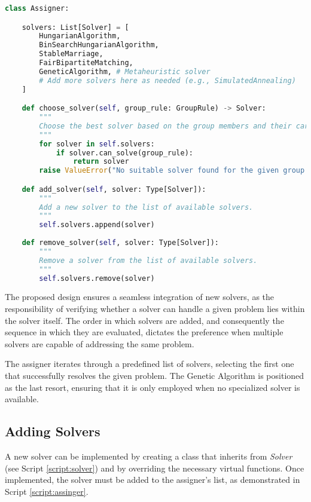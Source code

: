     \begin{lstlisting}[language=Python, caption={Assigner Class.}, label={script:assinger}]
class Assigner:

    solvers: List[Solver] = [
        HungarianAlgorithm,
        BinSearchHungarianAlgorithm,
        StableMarriage,
        FairBipartiteMatching,
        GeneticAlgorithm, # Metaheuristic solver
        # Add more solvers here as needed (e.g., SimulatedAnnealing)
    ]

    def choose_solver(self, group_rule: GroupRule) -> Solver:
        """
        Choose the best solver based on the group members and their cardinality.
        """
        for solver in self.solvers:
            if solver.can_solve(group_rule):
                return solver
        raise ValueError("No suitable solver found for the given group.")

    def add_solver(self, solver: Type[Solver]):
        """
        Add a new solver to the list of available solvers.
        """
        self.solvers.append(solver)
    
    def remove_solver(self, solver: Type[Solver]):
        """
        Remove a solver from the list of available solvers.
        """
        self.solvers.remove(solver)
\end{lstlisting}

            The proposed design ensures a seamless integration of new solvers, as the responsibility of verifying whether a solver can handle a given problem lies within the solver itself. The order in which solvers are added, and consequently the sequence in which they are evaluated, dictates the preference when multiple solvers are capable of addressing the same problem.

            The assigner iterates through a predefined list of solvers, selecting the first one that successfully resolves the given problem. The Genetic Algorithm is positioned as the last resort, ensuring that it is only employed when no specialized solver is available.

        \subsection{Adding Solvers}
            A new solver can be implemented by creating a class that inherits from \textit{Solver} (see Script \ref{script:solver}) and by overriding the necessary virtual functions.
            Once implemented, the solver must be added to the assigner's list, as demonstrated in Script \ref{script:assinger}.

